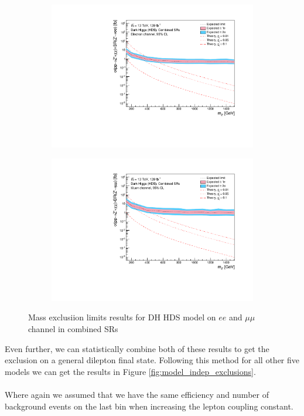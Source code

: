 \documentclass[12pt, a4paper]{book}
\begin{document}
\begin{figure}[!ht]
	\centering
	\begin{subfigure}[b]{0.49\textwidth}
      \centering
      \includegraphics[width=1\textwidth]{Limits/Model_independent/DH_HDS/mass_exclusion_ee.pdf}
   \end{subfigure}
   \hfill
   \begin{subfigure}[b]{0.49\textwidth}
      \centering
      \includegraphics[width=1\textwidth]{Limits/Model_independent/DH_HDS/mass_exclusion_uu.pdf}
   \end{subfigure}
   \caption{Mass exclusiion limits results for DH HDS model on $ee$ and $\mu\mu$ channel in combined SRs}\label{fig:DH_HDS_me_comb}
\end{figure}
Even further, we can statistically combine both of these results to get the exclusion on a general dilepton final state. Following this method for all other five models we can get the results in Figure \ref{fig:model_indep_exclusions}.\\
\\Where again we assumed that we have the same efficiency and number of background events on the last bin when increasing the lepton coupling constant.
\end{document}
